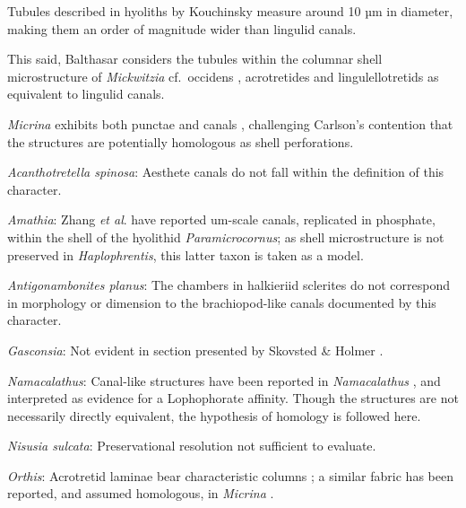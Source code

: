 \documentclass[openany]{book}
\theoremstyle{definition}
\theoremstyle{definition}
\theoremstyle{definition}
\theoremstyle{remark}
\begin{document}
Tubules described in hyoliths by Kouchinsky
\citeyearpar{Kouchinsky2000Skeletalmicrostructures} measure around 10 µm
in diameter, making them an order of magnitude wider than lingulid
canals.

This said, Balthasar \citeyearpar{Balthasar2008iMummpikia} considers the
tubules within the columnar shell microstructure of \emph{Mickwitzia}
cf.~occidens \citep[1--3 µm wide,][]{Skovsted2003EarlyCambrian},
acrotretides \citep[1 µm wide,
see][\citet{Zhang2016Epithelialcell}]{Holmer1989MiddleOrdovician} and
lingulellotretids \citep[100 nm wide,][]{Cusack1999Chemicostructural} as
equivalent to lingulid canals.

\emph{Micrina} exhibits both punctae and canals
\citep{Harper2017Brachiopodsorigin}, challenging Carlson's contention
\citep[in][]{Williams2007Supplement} that the structures are potentially
homologous as shell perforations.

\hypertarget{Acanthotretella_spinosa-coding-129}{}
\emph{Acanthotretella spinosa}: Aesthete canals do not fall within the
definition of this character.

\hypertarget{Amathia-coding-129}{}
\emph{Amathia}: Zhang \emph{et al}. \citeyearpar{Zhang2018Ahyolithid}
have reported um-scale canals, replicated in phosphate, within the shell
of the hyolithid \emph{Paramicrocornus}; as shell microstructure is not
preserved in \emph{Haplophrentis}, this latter taxon is taken as a
model.

\hypertarget{Antigonambonites_planus-coding-129}{}
\emph{Antigonambonites planus}: The chambers in halkieriid sclerites do
not correspond in morphology or dimension to the brachiopod-like canals
documented by this character.

\hypertarget{Gasconsia-coding-129}{}
\emph{Gasconsia}: Not evident in section presented by Skovsted \& Holmer
\citeyearpar{Skovsted2003EarlyCambrian}.

\hypertarget{Namacalathus-coding-129}{}
\emph{Namacalathus}: Canal-like structures have been reported in
\emph{Namacalathus} \citep{Zhuravlev2015Ediacaranskeletal}, and
interpreted as evidence for a Lophophorate affinity. Though the
structures are not necessarily directly equivalent, the hypothesis of
homology is followed here.

\hypertarget{Nisusia_sulcata-coding-129}{}
\emph{Nisusia sulcata}: Preservational resolution not sufficient to
evaluate.

\hypertarget{Orthis-coding-129}{}
\emph{Orthis}: Acrotretid laminae bear characteristic columns
\citep[e.g.][]{Zhang2016Epithelialcell}; a similar fabric has been
reported, and assumed homologous, in \emph{Micrina}
\citep{Butler2012ConstructingCambrian}.
\end{document}
